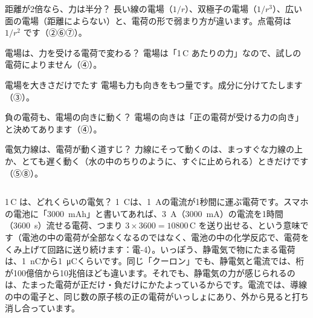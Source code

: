 \begin{tsumazuki}{距離が2倍なら、力は半分？}
長い線の電場（$1/r$）、双極子の電場（$1/r^3$）、広い面の電場（距離によらない）と、電荷の形で弱まり方が違います。点電荷は $1/r^2$ です（②⑥⑦）。
\end{tsumazuki}

\begin{tsumazuki}{電場は、力を受ける電荷で変わる？}
電場は「1\,C あたりの力」なので、試しの電荷によりません（④）。
\end{tsumazuki}

\begin{tsumazuki}{電場を大きさだけでたす}
電場も力も向きをもつ量です。成分に分けてたします（③）。
\end{tsumazuki}

\begin{tsumazuki}{負の電荷も、電場の向きに動く？}
電場の向きは「正の電荷が受ける力の向き」と決めてあります（④）。
\end{tsumazuki}

\begin{tsumazuki}{電気力線は、電荷が動く道すじ？}
力線にそって動くのは、まっすぐな力線の上か、とても遅く動く（水の中のちりのように、すぐに止められる）ときだけです（⑤⑧）。
\end{tsumazuki}

\begin{column}{1\,C は、どれくらいの電気？}
\qty{1}{C}は、\qty{1}{A}の電流が1秒間に運ぶ電荷です。スマホの電池に「\qty{3000}{mAh}」と書いてあれば、\qty{3}{A}（\qty{3000}{mA}）の電流を1時間（\qty{3600}{s}）流せる電荷、つまり $3\times3600=\num{10800}$\,C を送り出せる、という意味です（電池の中の電荷が全部なくなるのではなく、電池の中の化学反応で、電荷をくみ上げて回路に送り続けます：電-4）。いっぽう、静電気で物にたまる電荷は、\qty{1}{nC}から\qty{1}{\micro C}くらいです。同じ「クーロン」でも、静電気と電流では、桁が100億倍から10兆倍ほども違います。それでも、静電気の力が感じられるのは、たまった電荷が正だけ・負だけにかたよっているからです。電流では、導線の中の電子と、同じ数の原子核の正の電荷がいっしょにあり、外から見ると打ち消し合っています。
\end{column}

